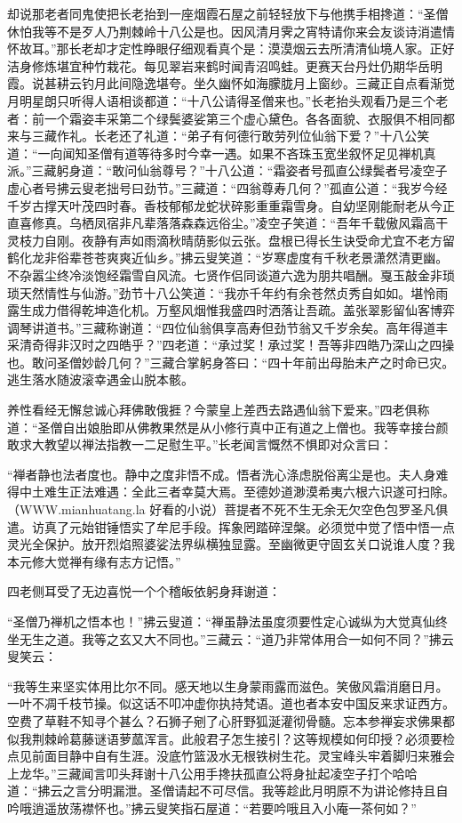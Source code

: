 \documentclass[12pt,UTF8]{ctexbook}
\begin{document}
却说那老者同鬼使把长老抬到一座烟霞石屋之前轻轻放下与他携手相搀道：“圣僧休怕我等不是歹人乃荆棘岭十八公是也。因风清月霁之宵特请你来会友谈诗消遣情怀故耳。”那长老却才定性睁眼仔细观看真个是：漠漠烟云去所清清仙境人家。正好洁身修炼堪宜种竹栽花。每见翠岩来鹤时闻青沼鸣蛙。更赛天台丹灶仍期华岳明霞。说甚耕云钓月此间隐逸堪夸。坐久幽怀如海朦胧月上窗纱。三藏正自点看渐觉月明星朗只听得人语相谈都道：“十八公请得圣僧来也。”长老抬头观看乃是三个老者：前一个霜姿丰采第二个绿鬓婆娑第三个虚心黛色。各各面貌、衣服俱不相同都来与三藏作礼。长老还了礼道：“弟子有何德行敢劳列位仙翁下爱？”十八公笑道：“一向闻知圣僧有道等待多时今幸一遇。如果不吝珠玉宽坐叙怀足见禅机真派。”三藏躬身道：“敢问仙翁尊号？”十八公道：“霜姿者号孤直公绿鬓者号凌空子虚心者号拂云叟老拙号曰劲节。”三藏道：“四翁尊寿几何？”孤直公道：“我岁今经千岁古撑天叶茂四时春。香枝郁郁龙蛇状碎影重重霜雪身。自幼坚刚能耐老从今正直喜修真。乌栖凤宿非凡辈落落森森远俗尘。”凌空子笑道：“吾年千载傲风霜高干灵枝力自刚。夜静有声如雨滴秋晴荫影似云张。盘根已得长生诀受命尤宜不老方留鹤化龙非俗辈苍苍爽爽近仙乡。”拂云叟笑道：“岁寒虚度有千秋老景潇然清更幽。不杂嚣尘终冷淡饱经霜雪自风流。七贤作侣同谈道六逸为朋共唱酬。戛玉敲金非琐琐天然情性与仙游。”劲节十八公笑道：“我亦千年约有余苍然贞秀自如如。堪怜雨露生成力借得乾坤造化机。万壑风烟惟我盛四时洒落让吾疏。盖张翠影留仙客博弈调琴讲道书。”三藏称谢道：“四位仙翁俱享高寿但劲节翁又千岁余矣。高年得道丰采清奇得非汉时之四皓乎？”四老道：“承过奖！承过奖！吾等非四皓乃深山之四操也。敢问圣僧妙龄几何？”三藏合掌躬身答曰：“四十年前出母胎未产之时命已灾。逃生落水随波滚幸遇金山脱本骸。

养性看经无懈怠诚心拜佛敢俄捱？今蒙皇上差西去路遇仙翁下爱来。”四老俱称道：“圣僧自出娘胎即从佛教果然是从小修行真中正有道之上僧也。我等幸接台颜敢求大教望以禅法指教一二足慰生平。”长老闻言慨然不惧即对众言曰：

“禅者静也法者度也。静中之度非悟不成。悟者洗心涤虑脱俗离尘是也。夫人身难得中土难生正法难遇：全此三者幸莫大焉。至德妙道渺漠希夷六根六识遂可扫除。（WWW.mianhuatang.la 好看的小说）菩提者不死不生无余无欠空色包罗圣凡俱遣。访真了元始钳锤悟实了牟尼手段。挥象罔踏碎涅槃。必须觉中觉了悟中悟一点灵光全保护。放开烈焰照婆娑法界纵横独显露。至幽微更守固玄关口说谁人度？我本元修大觉禅有缘有志方记悟。”

四老侧耳受了无边喜悦一个个稽皈依躬身拜谢道：

“圣僧乃禅机之悟本也！”拂云叟道：“禅虽静法虽度须要性定心诚纵为大觉真仙终坐无生之道。我等之玄又大不同也。”三藏云：“道乃非常体用合一如何不同？”拂云叟笑云：

“我等生来坚实体用比尔不同。感天地以生身蒙雨露而滋色。笑傲风霜消磨日月。一叶不凋千枝节操。似这话不叩冲虚你执持梵语。道也者本安中国反来求证西方。空费了草鞋不知寻个甚么？石狮子剜了心肝野狐涎灌彻骨髓。忘本参禅妄求佛果都似我荆棘岭葛藤谜语萝蓏浑言。此般君子怎生接引？这等规模如何印授？必须要检点见前面目静中自有生涯。没底竹篮汲水无根铁树生花。灵宝峰头牢着脚归来雅会上龙华。”三藏闻言叩头拜谢十八公用手搀扶孤直公将身扯起凌空子打个哈哈道：“拂云之言分明漏泄。圣僧请起不可尽信。我等趁此月明原不为讲论修持且自吟哦逍遥放荡襟怀也。”拂云叟笑指石屋道：“若要吟哦且入小庵一茶何如？”
\end{document}
